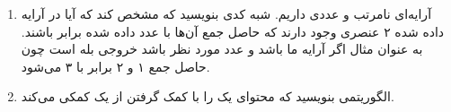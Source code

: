 \documentclass{article}
\begin{document}
\begin{enumerate}
	\item آرایه‌ای نامرتب و عددی داریم. شبه کدی بنویسید که مشخص کند که آیا در آرایه داده شده ۲ عنصری وجود دارند که حاصل جمع آن‌ها با عدد داده شده برابر باشند. به عنوان مثال اگر آرایه ما \lr{[1, 4, 2]} باشد و عدد مورد نظر  باشد خروجی بله است چون حاصل جمع ۱ و ۲ برابر با ۳ می‌شود. 
	\item الگوریتمی بنویسید که محتوای یک  را با کمک گرفتن از یک  کمکی  می‌کند. 
\end{enumerate}

\newpage
\end{document}
